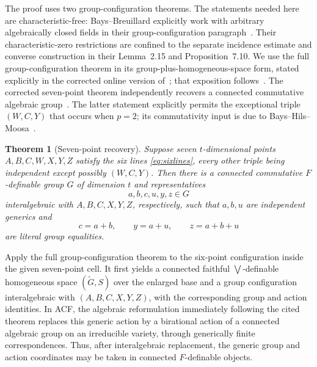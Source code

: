 \documentclass[11pt]{article}
\newtheorem{theorem}{Theorem}[section]
\theoremstyle{definition}
\begin{document}
The proof uses two group-configuration theorems.  The statements needed here are characteristic-free: Bays--Breuillard explicitly work with arbitrary algebraically closed fields in their group-configuration paragraph~\cite[Section~3.0.1]{BaysBreuillard2021}.  Their characteristic-zero restrictions are confined to the separate incidence estimate and converse construction in their Lemma~2.15 and Proposition~7.10.  We use the full group-configuration theorem in its group-plus-homogeneous-space form, stated explicitly in the corrected online version of~\cite[Theorem~6.1]{BaysGST2018}; that exposition follows~\cite[Theorem~5.4.5 and Remark~5.4.10]{Pillay1996}.  The corrected seven-point theorem independently recovers a connected commutative algebraic group~\cite[Theorem~3.3]{BaysBreuillard2021}.  The latter statement explicitly permits the exceptional triple $(W,C,Y)$ that occurs when $p=2$; its commutativity input is due to Bays--Hils--Moosa~\cite[Theorem~C.1]{BaysHilsMoosa2017}.

\begin{theorem}[Seven-point recovery]\label{thm:recovery}
Suppose seven $t$-dimensional points $A,B,C,W,X,Y,Z$ satisfy the six lines \eqref{eq:sixlines}, every other triple being independent except possibly $(W,C,Y)$.  Then there is a connected commutative $F$-definable group $G$ of dimension $t$ and representatives
\[
a,b,c,u,y,z\in G
\]
interalgebraic with $A,B,C,X,Y,Z$, respectively, such that $a,b,u$ are independent generics and
\[
c=a+b,\qquad y=a+u,\qquad z=a+b+u
\]
are literal group equalities.
\end{theorem}

Apply the full group-configuration theorem to the six-point configuration inside the given seven-point cell.  It first yields a connected faithful $\bigvee$-definable homogeneous space $(\widetilde G,S)$ over the enlarged base and a group configuration interalgebraic with $(A,B,C,X,Y,Z)$, with the corresponding group and action identities.  In ACF, the algebraic reformulation immediately following the cited theorem replaces this generic action by a birational action of a connected algebraic group on an irreducible variety, through generically finite correspondences.  Thus, after interalgebraic replacement, the generic group and action coordinates may be taken in connected $F$-definable objects.
\end{document}
